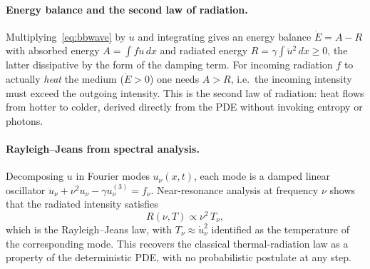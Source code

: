 \documentclass[11pt]{article}
\begin{document}
\paragraph{Energy balance and the second law of radiation.}
Multiplying~\eqref{eq:bbwave} by $\dot u$ and integrating gives an energy balance $\dot E = A - R$ with absorbed energy $A = \int f \dot u\,dx$ and radiated energy $R = \gamma \int \ddot u^2\,dx \ge 0$, the latter dissipative by the form of the damping term. For incoming radiation $f$ to actually \emph{heat} the medium ($\dot E > 0$) one needs $A > R$, i.e.\ the incoming intensity must exceed the outgoing intensity. This is the second law of radiation: heat flows from hotter to colder, derived directly from the PDE without invoking entropy or photons.

\paragraph{Rayleigh--Jeans from spectral analysis.}
Decomposing $u$ in Fourier modes $u_\nu(x,t)$, each mode is a damped linear oscillator
$\ddot u_\nu + \nu^2 u_\nu - \gamma u_\nu^{(3)} = f_\nu$.
Near-resonance analysis at frequency $\nu$ shows that the radiated intensity satisfies
\begin{equation}
R(\nu, T) \propto \nu^2 \, T_\nu,
\label{eq:rayleighjeans}
\end{equation}
which is the Rayleigh--Jeans law, with $T_\nu \approx \dot u_\nu^2$ identified as the temperature of the corresponding mode. This recovers the classical thermal-radiation law as a property of the deterministic PDE, with no probabilistic postulate at any step.
\end{document}

